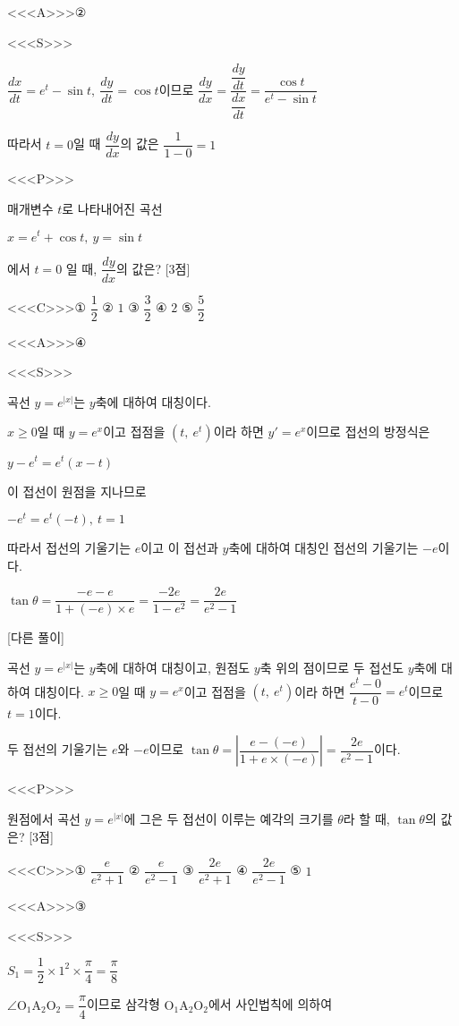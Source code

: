 \documentclass{oblivoir}
\begin{document}
<<<A>>>②

<<<S>>>

$\dfrac{dx}{dt}= e^{t}-\sin t ,\:\dfrac{dy}{dt}=\cos t$이므로 $\dfrac{dy}{dx}=\dfrac{\dfrac{dy}{dt}}{\dfrac{dx}{dt}}=\dfrac{\cos t}{e^{t}-\sin t}$

따라서 $t=0$일 때 $\dfrac{dy}{dx}$의 값은 $\dfrac{1}{1-0}=1$

<<<P>>>

매개변수 $t$로 나타내어진 곡선 

$x= e^{t}+\cos t,\:y=\sin t$

에서 $t=0$ 일 때, $\dfrac{dy}{dx}$의 값은? [3점]

<<<C>>>① $\dfrac{1}{2}$ ② $1$ ③ $\dfrac{3}{2}$ ④ $2$ ⑤ $\dfrac{5}{2}$

<<<A>>>④

<<<S>>>

곡선 $y=e^{| x |}$는 $y$축에 대하여 대칭이다. 

$x\ge 0$일 때 $y=e^{x}$이고 접점을 $(t,\: e^{t})$이라 하면 $y'=e^{x}$이므로 접선의 방정식은

$y-e^{t}=e^{t}(x-t)$

이 접선이 원점을 지나므로

$-e^{t}=e^{t}(-t),\: t=1$

따라서 접선의 기울기는 $e$이고 이 접선과 $y$축에 대하여 대칭인 접선의 기울기는 $-e$이다.

$\tan\theta =\dfrac{-e-e}{1+(-e)\times e}=\dfrac{-2e}{1-e^{2}}=\dfrac{2e}{e^{2}-1}$

[다른 풀이]

곡선 $y=e^{| x |}$는 $y$축에 대하여 대칭이고, 원점도 $y$축 위의 점이므로 두 접선도 $y$축에 대하여 대칭이다. $x\ge 0$일 때 $y=e^{x}$이고 접점을 $(t,\: e^{t})$이라 하면 $\dfrac{e^{t}-0}{t-0}=e^{t}$이므로 $t=1$이다.

두 접선의 기울기는 $e$와 $-e$이므로 $\tan\theta =\left |\dfrac{e-(-e)}{1+e\times(-e)}\right | =\dfrac{2e}{e^{2}-1}$이다.

<<<P>>>

원점에서 곡선 $y=e^{| x |}$에 그은 두 접선이 이루는 예각의 크기를 $\theta$라 할 때, $\tan\theta$의 값은? [3점]

<<<C>>>① $\dfrac{e}{e^{2}+1}$ ② $\dfrac{e}{e^{2}-1}$ ③ $\dfrac{2e}{e^{2}+1}$ ④ $\dfrac{2e}{e^{2}-1}$ ⑤ $1$

<<<A>>>③

<<<S>>>

$S_{1}=\dfrac{1}{2}\times 1^{2}\times\dfrac{\pi}{4}=\dfrac{\pi}{8}$

$\angle\mathrm{O}_{1}\mathrm{A}_{2}\mathrm{O}_{2}=\dfrac{\pi}{4}$이므로 삼각형 $\mathrm{O}_{1}\mathrm{A}_{2}\mathrm{O}_{2}$에서 사인법칙에 의하여
\end{document}
